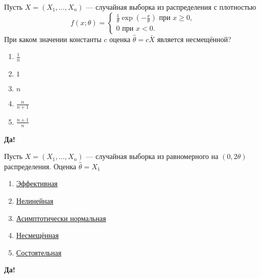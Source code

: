 \documentclass[t]{beamer}
\begin{document}
 \begin{frame} \label{45-Yes} 
\begin{block}{45} 

Пусть $X = (X_1, \ldots , X_n)$ — случайная выборка из распределения с плотностью
\[
f(x; \theta) =
\begin{cases}
\frac{1}{\theta}\exp(-\frac{x}{\theta}) \text{ при } x \geq 0,  \\
0 \text{ при } x < 0.
\end{cases}
\]
При каком значении константы $c$ оценка  $\hat{\theta} = c \bar{X}$ является несмещённой?
  


 \end{block} 
\begin{enumerate} 
\item[] \hyperlink{45-No}{\beamergotobutton{} $\frac{1}{n}$}
\item[] \hyperlink{45-Yes}{\beamergotobutton{} $1$}
\item[] \hyperlink{45-No}{\beamergotobutton{} $n$}
\item[] \hyperlink{45-No}{\beamergotobutton{} $\frac{n}{n + 1}$}
\item[] \hyperlink{45-No}{\beamergotobutton{} $\frac{n + 1}{n}$}
\end{enumerate} 

 \textbf{Да!} 
 \hyperlink{46}{}\end{frame} 


 \begin{frame} \label{46-Yes} 
\begin{block}{46} 

Пусть $X = (X_1, \ldots , X_n)$ — случайная выборка из равномерного на $(0, 2\theta)$ распределения. Оценка $\hat{\theta} = X_1$
  


 \end{block} 
\begin{enumerate} 
\item[] \hyperlink{46-No}{\beamergotobutton{} Эффективная}
\item[] \hyperlink{46-No}{\beamergotobutton{} Нелинейная}
\item[] \hyperlink{46-No}{\beamergotobutton{} Асимптотически нормальная}
\item[] \hyperlink{46-Yes}{\beamergotobutton{} Несмещённая}
\item[] \hyperlink{46-No}{\beamergotobutton{} Состоятельная}
\end{enumerate} 

 \textbf{Да!} 
 \hyperlink{47}{}\end{frame} 
\end{document}

